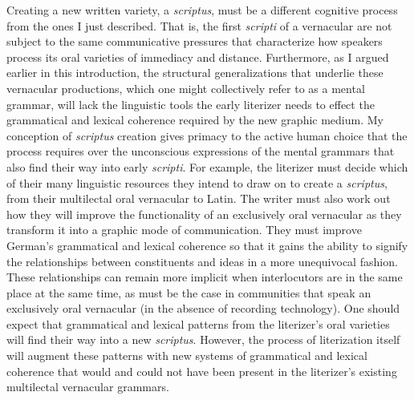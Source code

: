 Creating a new written variety, a \textit{scriptus}, must be a different cognitive process from the ones I just described. That is, the first \textit{scripti} of a vernacular are not subject to the same communicative pressures that characterize how speakers process its oral varieties of immediacy and distance. Furthermore, as I argued earlier in this introduction, the structural generalizations that underlie these vernacular productions, which one might collectively refer to as a mental grammar, will lack the linguistic tools the early literizer needs to effect the grammatical and lexical coherence required by the new graphic medium. My conception of \textit{scriptus} creation gives primacy to the active human choice that the process requires over the unconscious expressions of the mental grammars that also find their way into early \textit{scripti}. For example, the literizer must decide which of their many linguistic resources they intend to draw on to create a \textit{scriptus}, from their multilectal oral vernacular to Latin. The writer must also work out how they will improve the functionality of an exclusively oral vernacular as they transform it into a graphic mode of communication. They must improve German’s grammatical and lexical coherence so that it gains the ability to signify the relationships between constituents and ideas in a more unequivocal fashion. These relationships can remain more implicit when interlocutors are in the same place at the same time, as must be the case in communities that speak an exclusively oral vernacular (in the absence of recording technology). One should expect that grammatical and lexical patterns from the literizer’s oral varieties will find their way into a new \textit{scriptus}. However, the process of literization itself will augment these patterns with new systems of grammatical and lexical coherence that would and could not have been present in the literizer’s existing multilectal vernacular grammars. 

